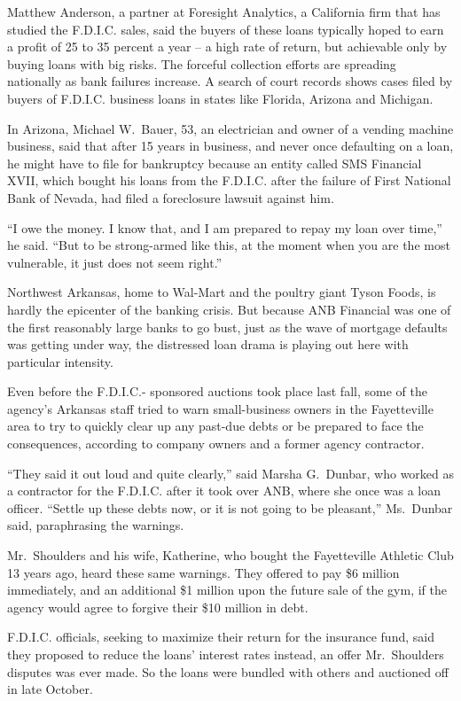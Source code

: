 \documentclass[12pt,a4paper,onecolumn]{article}
\begin{document}
Matthew Anderson, a partner at Foresight Analytics, a California firm that has studied the F.D.I.C.
sales, said the buyers of these loans typically hoped to earn a profit of 25 to 35 percent a year --
a high rate of return, but achievable only by buying loans with big risks. The forceful collection
efforts are spreading nationally as bank failures increase. A search of court records shows cases
filed by buyers of F.D.I.C. business loans in states like Florida, Arizona and Michigan.

In Arizona, Michael W.~Bauer, 53, an electrician and owner of a vending machine business, said that
after 15 years in business, and never once defaulting on a loan, he might have to file for
bankruptcy because an entity called SMS Financial XVII, which bought his loans from the F.D.I.C.
after the failure of First National Bank of Nevada, had filed a foreclosure lawsuit against him.

``I owe the money. I know that, and I am prepared to repay my loan over time,'' he said. ``But to be
strong-armed like this, at the moment when you are the most vulnerable, it just does not seem
right.''

Northwest Arkansas, home to Wal-Mart and the poultry giant Tyson Foods, is hardly the epicenter of
the banking crisis. But because ANB Financial was one of the first reasonably large banks to go
bust, just as the wave of mortgage defaults was getting under way, the distressed loan drama is
playing out here with particular intensity.

Even before the F.D.I.C.- sponsored auctions took place last fall, some of the agency's Arkansas
staff tried to warn small-business owners in the Fayetteville area to try to quickly clear up any
past-due debts or be prepared to face the consequences, according to company owners and a former
agency contractor.

``They said it out loud and quite clearly,'' said Marsha G.~Dunbar, who worked as a contractor for
the F.D.I.C. after it took over ANB, where she once was a loan officer. ``Settle up these debts now,
or it is not going to be pleasant,'' Ms.~Dunbar said, paraphrasing the warnings.

Mr.~Shoulders and his wife, Katherine, who bought the Fayetteville Athletic Club 13 years ago, heard
these same warnings. They offered to pay \$6 million immediately, and an additional \$1 million upon
the future sale of the gym, if the agency would agree to forgive their \$10 million in debt.

F.D.I.C. officials, seeking to maximize their return for the insurance fund, said they proposed to
reduce the loans' interest rates instead, an offer Mr.~Shoulders disputes was ever made. So the
loans were bundled with others and auctioned off in late October.
\end{document}
